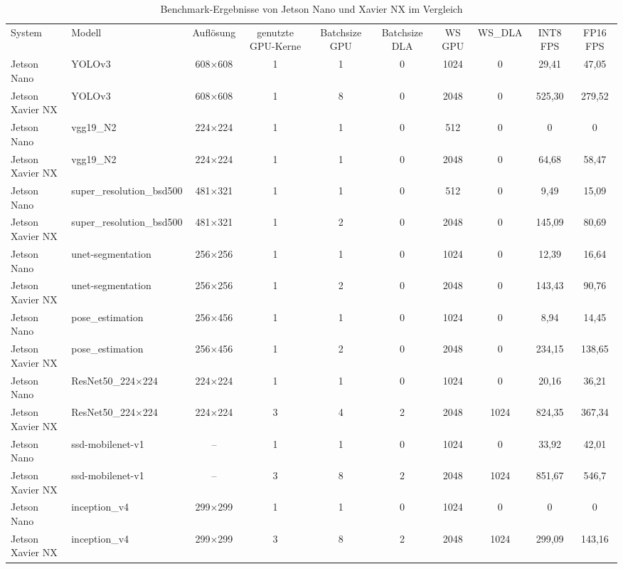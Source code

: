 \begin{table}
\begin{tabular}{llccc ccccc}
	System & 	Modell &	Auflösung &	genutzte GPU-Kerne &	Batchsize GPU & 	Batchsize DLA &	WS GPU &	WS\_DLA &	INT8 FPS &	FP16 FPS  \\
	Jetson Nano &	YOLOv3 &	608×608 &	1 &	1 &	0 &	1024 &	0 &	29,41 &	47,05 \\
	Jetson Xavier NX &	YOLOv3 &	608×608 &	1 &	8 &	0 &	2048 &	0 &	525,30 &	279,52 \\
	Jetson Nano &	vgg19\_N2 &	224×224 &	1 &	1 &	0 &	512 &	0 &	0 &	0 \\
	Jetson Xavier NX &	vgg19\_N2 &	224×224 &	1 &	1 &	0 &	2048 &	0 &	64,68 &	58,47 \\
	Jetson Nano & 	super\_resolution\_bsd500 &	481×321 &	1 &	1 &	0 &	512 &	0 &	9,49 &	15,09 \\
	Jetson Xavier NX &	super\_resolution\_bsd500 &	481×321 &	1 &	2 &	0 &	2048 &	0 &	145,09 &	80,69 \\
	Jetson Nano &	unet-segmentation &	256×256 &	1 &	1 &	0 &	1024 &	0 &	12,39 &	16,64 \\
	Jetson Xavier NX  & unet-segmentation  & 256×256  & 1  & 2  & 0  & 2048  & 0  & 143,43  & 90,76 \\
    Jetson Nano  & pose\_estimation  & 256×456  & 1  & 1  & 0  & 1024  & 0  & 8,94  & 14,45 \\
    Jetson Xavier NX  & pose\_estimation  & 256×456  & 1  & 2  & 0  & 2048  & 0  & 234,15  & 138,65 \\
    Jetson Nano  & ResNet50\_224×224  & 224×224  & 1  & 1  & 0  & 1024  & 0  & 20,16  & 36,21 \\
    Jetson Xavier NX  & ResNet50\_224×224  & 224×224  & 3  & 4  & 2  & 2048  & 1024  & 824,35  & 367,34 \\
    Jetson Nano  & ssd-mobilenet-v1  & –  & 1  & 1  & 0  & 1024  & 0  & 33,92  & 42,01 \\
    Jetson Xavier NX  & ssd-mobilenet-v1  & –  & 3  & 8  & 2  & 2048  & 1024  & 851,67  & 546,7 \\
    Jetson Nano  & inception\_v4  & 299×299  & 1  & 1  & 0  & 1024  & 0  & 0  & 0 \\
    Jetson Xavier NX  & inception\_v4  & 299×299  & 3  & 8  & 2  & 2048  & 1024  & 299,09  & 143,16 \\
  \end{tabular}	
  \caption{Benchmark-Ergebnisse von Jetson Nano und Xavier NX im Vergleich}
\end{table}


